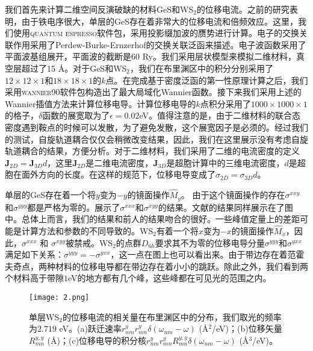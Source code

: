 我们首先来计算二维空间反演破缺的材料GeS和WS$_{2}$的位移电流。之前的研究表明，由于铁电序很大，单层的GeS存在着非常大的位移电流和倍频效应\cite{rangel_giant_2016,panday_strong_2017}。这里，我们使用\textsc{quantum espresso}软件包\cite{giannozzi_quantum_2009}，采用投影缀加波的赝势\cite{dal_corso_pseudopotentials_2014}进行计算。电子的交换关联作用采用了Perdew-Burke-Ernzerhof的交换关联泛函\cite{perdew_generalized_1996}来描述。电子波函数采用了平面波基组展开，平面波的截断是60 Ry。我们采用层状模型来模拟二维材料，真空层超过了15 \AA。对于GeS和WS$_2$，我们在布里渊区中的积分分别采用了 $12\times12\times1$和$18\times18\times1$的$k$点。在完成基于密度泛函的第一性原理计算之后，我们采用\textsc{wannier90}软件包\cite{mostofi_updated_2014}构造出了最大局域化Wannier函数。接下来我们采用上述的Wannier插值方法来计算位移电导。计算位移电导的$k$点积分采用了$1000\times1000\times1$的格子，$\delta$函数的展宽取为了$\epsilon = 0.02$eV。值得注意的是，由于二维材料的联合态密度遇到鞍点的时候可以发散，为了避免发散，这个展宽因子是必须的。经过我们的测试，自旋轨道耦合仅仅会稍微改变结果，因此，我们在这里展示没有考虑自旋轨道耦合的结果，方便分析。对于二维材料，我们采用了二维的电流密度的定义$\mathbf{J}_{2D}=\mathbf{J}_{3D}d$，这里$\mathbf{J}_{2D}$是二维电流密度，$\mathbf{J}_{3D}$是超胞计算中的三维电流密度，$d$是超胞在面外方向的长度。在这样的规范下，位移电导变成了$\sigma_{2D}=\sigma_{3D}d$。


单层的GeS存在着一个将$y$变为$-y$的镜面操作$\hat{M}_{y}$。 由于这个镜面操作的存在$\sigma^{xxy}$和$\sigma^{yyy}$都是严格为零的。展示了$\sigma^{xxx}$和$\sigma^{xyy}$的结果。文献的结果同样展示在了图中。总体上而言，我们的结果和前人的结果吻合的很好。一些峰值定量上的差距可能是计算方法和参数的不同导致的。WS$_2$有着一个将$x$变为$-x$的镜面操作$\hat{M}_{x}$，因此，$\sigma^{xxx}$ 和 $\sigma^{xyy}$被禁戒。WS$_2$的点群$D_{6h}$要求其不为零的位移电导分量$\sigma^{yyy}$和$\sigma^{yxx}$满足如下关系：$\sigma^{yyy}=-\sigma^{yxx}$，这一点在图上也可以看出来。由于带边存在着范霍夫奇点，两种材料的位移电导都在带边存在着小小的跳跃。除此之外，我们看到两个材料高于带隙$1$eV的地方都有几个峰，这些峰都在可见光的范围之内。

\begin{figure}
	\begin{centering}
	\texttt{[image: 2.png]}
	\par\end{centering}
	\caption{\label{fig2} 单层WS$_{2}$的位移电流的相关量在布里渊区中的分布，我们取光的频率为$2.719$ eV。(a)跃迁速率$r_{nm}^{y}r_{mn}^{y}\delta(\omega_{nm}-\omega)$ (\AA$^{2}$/eV)；(b)位移矢量$R_{mn}^{y,y}$ (\AA)；(c)位移电导的积分核$r_{nm}^{y}r_{mn}^{y}R_{mn}^{y,y}\delta(\omega_{nm}-\omega)$ (\AA$^{3}$/eV)。}
\end{figure}

